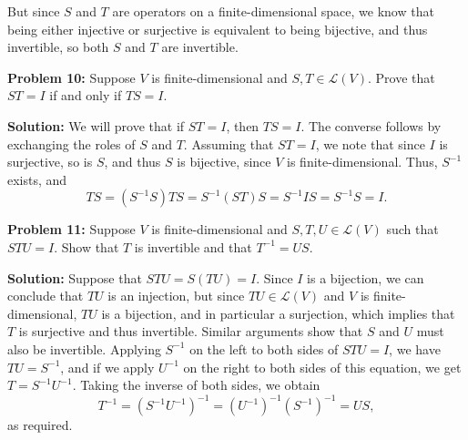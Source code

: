 \documentclass[12pt,letterpaper]{article}
\renewcommand{\L}{\mathcal{L}}
\begin{document}
But since $S$ and $T$ are operators on a finite-dimensional space, we know that being either injective or surjective is equivalent to being bijective, and thus invertible, so both $S$ and $T$ are invertible.

{\bf Problem 10:} Suppose $V$ is finite-dimensional and $S, T\in\L(V)$. Prove that $ST=I$ if and only if $TS=I$.

{\bf Solution:} We will prove that if $ST=I$, then $TS=I$. The converse follows by exchanging the roles of $S$ and $T$. Assuming that $ST=I$, we note that since $I$ is surjective, so is $S$, and thus $S$ is bijective, since $V$ is finite-dimensional. Thus, $S^{-1}$ exists, and
\[
TS = (S^{-1}S)TS = S^{-1}(ST)S = S^{-1}IS = S^{-1}S=I.
\]

\bigskip

{\bf Problem 11:} Suppose $V$ is finite-dimensional and $S,T,U\in\L(V)$ such that $STU=I$. Show that $T$ is invertible and that $T^{-1}=US$.

\bigskip

{\bf Solution:} Suppose that $STU=S(TU)=I$. Since $I$ is a bijection, we can conclude that $TU$ is an injection, but since $TU\in\L(V)$ and $V$ is finite-dimensional, $TU$ is a bijection, and in particular a surjection, which implies that $T$ is surjective and thus invertible. Similar arguments show that $S$ and $U$ must also be invertible. Applying $S^{-1}$ on the left to both sides of $STU=I$, we have $TU=S^{-1}$, and if we apply $U^{-1}$ on the right to both sides of this equation, we get $T=S^{-1}U^{-1}$. Taking the inverse of both sides, we obtain
\[
T^{-1} = (S^{-1}U^{-1})^{-1} = (U^{-1})^{-1}(S^{-1})^{-1} = US,
\]
as required.
\end{document}
